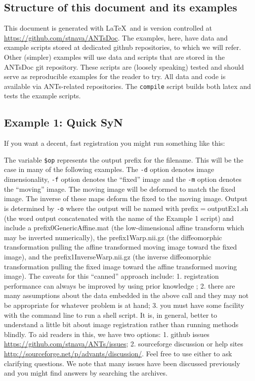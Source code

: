 \documentclass{InsightArticle}
\begin{document}
\subsection{Structure of this document and its examples}
This document is generated with \LaTeX ~and is version controlled at
\href{https://github.com/stnava/ANTsDoc}{https://github.com/stnava/ANTsDoc}.
The examples, here, have data and example scripts stored at dedicated
github repositories, to which we will refer.  Other (simpler) examples will use
data and scripts that are stored in the ANTsDoc git repository.  These
scripts are (loosely speaking) tested and should serve as reproducible
examples for the reader to try.  All data and code is available via
ANTs-related repositories.  The \texttt{compile} script builds both
latex and tests the example scripts.

\subsection{Example 1: Quick SyN}
If you want a decent, fast registration you might run something like this:

The variable \texttt{\$op} represents the output prefix for the
filename.  This will be the case in many of the following examples.
The \texttt{-d} option denotes image dimensionality, \texttt{-f} option denotes the ``fixed'' image and the \texttt{-m} option
denotes the ``moving'' image.  The moving image will be deformed to
match the fixed image.  The inverse of these maps deform the fixed to
the moving image.  Output is determined by \texttt{-o} where the output
will be named with prefix$=$outputEx1.sh (the word output concatenated
with the name of the Example 1 script) and include a
prefix0GenericAffine.mat (the low-dimensional affine transform which
may be inverted numerically), the prefix1Warp.nii.gz (the
diffeomorphic transformation pulling the affine transformed moving
image toward the fixed image), and the prefix1InverseWarp.nii.gz (the inverse
diffeomorphic transformation pulling the fixed image toward the affine transformed moving
image).
The caveats for this ``canned'' approach include:  1. registration
performance can always be improved by using prior knowledge
\cite{Wolpert1997}; 2. there are many assumptions about the data
embedded in the above call and they may not be appropriate for
whatever problem is at hand; 3. you must have some facility with the command line
to run a shell script.  It is, in general, better to understand a
little bit about image registration rather than running methods
blindly.   To aid readers in this, we have two options: 1. github
issues
\href{https://github.com/stnava/ANTs/issues}{https://github.com/stnava/ANTs/issues};
2.  sourceforge discussion or help sites
\href{http://sourceforge.net/p/advants/discussion/}{http://sourceforge.net/p/advants/discussion/}.
Feel free to use either to ask clarifying questions.  We note that many
issues have been discussed previously and you might find answers by
searching the archives.
\end{document}
